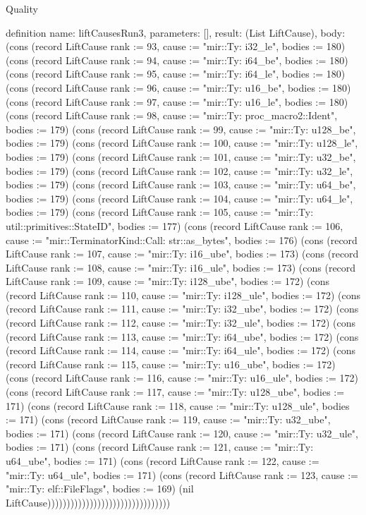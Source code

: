 \begin{lexlean}{Quality}
\begin{semanticmodule}
definition{
  name: liftCausesRun3,
  parameters: [],
  result: (List LiftCause),
  body: (cons (record LiftCause {rank := 93, cause := "mir::Ty: i32_le", bodies := 180}) (cons (record LiftCause {rank := 94, cause := "mir::Ty: i64_be", bodies := 180}) (cons (record LiftCause {rank := 95, cause := "mir::Ty: i64_le", bodies := 180}) (cons (record LiftCause {rank := 96, cause := "mir::Ty: u16_be", bodies := 180}) (cons (record LiftCause {rank := 97, cause := "mir::Ty: u16_le", bodies := 180}) (cons (record LiftCause {rank := 98, cause := "mir::Ty: proc_macro2::Ident", bodies := 179}) (cons (record LiftCause {rank := 99, cause := "mir::Ty: u128_be", bodies := 179}) (cons (record LiftCause {rank := 100, cause := "mir::Ty: u128_le", bodies := 179}) (cons (record LiftCause {rank := 101, cause := "mir::Ty: u32_be", bodies := 179}) (cons (record LiftCause {rank := 102, cause := "mir::Ty: u32_le", bodies := 179}) (cons (record LiftCause {rank := 103, cause := "mir::Ty: u64_be", bodies := 179}) (cons (record LiftCause {rank := 104, cause := "mir::Ty: u64_le", bodies := 179}) (cons (record LiftCause {rank := 105, cause := "mir::Ty: util::primitives::StateID", bodies := 177}) (cons (record LiftCause {rank := 106, cause := "mir::TerminatorKind::Call: str::as_bytes", bodies := 176}) (cons (record LiftCause {rank := 107, cause := "mir::Ty: i16_ube", bodies := 173}) (cons (record LiftCause {rank := 108, cause := "mir::Ty: i16_ule", bodies := 173}) (cons (record LiftCause {rank := 109, cause := "mir::Ty: i128_ube", bodies := 172}) (cons (record LiftCause {rank := 110, cause := "mir::Ty: i128_ule", bodies := 172}) (cons (record LiftCause {rank := 111, cause := "mir::Ty: i32_ube", bodies := 172}) (cons (record LiftCause {rank := 112, cause := "mir::Ty: i32_ule", bodies := 172}) (cons (record LiftCause {rank := 113, cause := "mir::Ty: i64_ube", bodies := 172}) (cons (record LiftCause {rank := 114, cause := "mir::Ty: i64_ule", bodies := 172}) (cons (record LiftCause {rank := 115, cause := "mir::Ty: u16_ube", bodies := 172}) (cons (record LiftCause {rank := 116, cause := "mir::Ty: u16_ule", bodies := 172}) (cons (record LiftCause {rank := 117, cause := "mir::Ty: u128_ube", bodies := 171}) (cons (record LiftCause {rank := 118, cause := "mir::Ty: u128_ule", bodies := 171}) (cons (record LiftCause {rank := 119, cause := "mir::Ty: u32_ube", bodies := 171}) (cons (record LiftCause {rank := 120, cause := "mir::Ty: u32_ule", bodies := 171}) (cons (record LiftCause {rank := 121, cause := "mir::Ty: u64_ube", bodies := 171}) (cons (record LiftCause {rank := 122, cause := "mir::Ty: u64_ule", bodies := 171}) (cons (record LiftCause {rank := 123, cause := "mir::Ty: elf::FileFlags", bodies := 169}) (nil LiftCause))))))))))))))))))))))))))))))))
}


\end{semanticmodule}
\end{lexlean}
